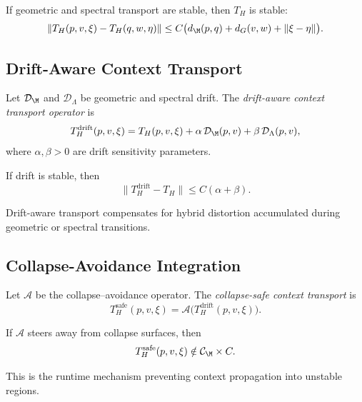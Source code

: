 \begin{lemma}
If geometric and spectral transport are stable, then $T_H$ is stable:
\[
\| T_H(p,v,\xi) - T_H(q,w,\eta) \|
\le C \big( d_\M(p,q) + d_G(v,w) + \|\xi - \eta\| \big).
\]
\end{lemma}

\subsection{Drift-Aware Context Transport}

\begin{definition}
Let $\mathcal{D}_\M$ and $\mathcal{D}_\Lambda$ be geometric and spectral drift.
The \emph{drift-aware context transport operator} is
\[
T_H^\mathrm{drift}(p,v,\xi)
= T_H(p,v,\xi)
+ \alpha\, \mathcal{D}_\M(p,v)
+ \beta\, \mathcal{D}_\Lambda(p,v),
\]
where $\alpha,\beta > 0$ are drift sensitivity parameters.
\end{definition}

\begin{lemma}
If drift is stable, then
\[
\| T_H^\mathrm{drift} - T_H \|
\le C (\alpha + \beta).
\]
\end{lemma}

\begin{remark}
Drift-aware transport compensates for hybrid distortion accumulated during
geometric or spectral transitions.
\end{remark}

\subsection{Collapse-Avoidance Integration}

\begin{definition}
Let $\mathcal{A}$ be the collapse--avoidance operator.  
The \emph{collapse-safe context transport} is
\[
T_H^\mathrm{safe}(p,v,\xi)
= \mathcal{A}\big( T_H^\mathrm{drift}(p,v,\xi) \big).
\]
\end{definition}

\begin{lemma}
If $\mathcal{A}$ steers away from collapse surfaces, then
\[
T_H^\mathrm{safe}(p,v,\xi) \notin \mathcal{C}_\M \times C.
\]
\end{lemma}

\begin{remark}
This is the runtime mechanism preventing context propagation into unstable
regions.
\end{remark}

